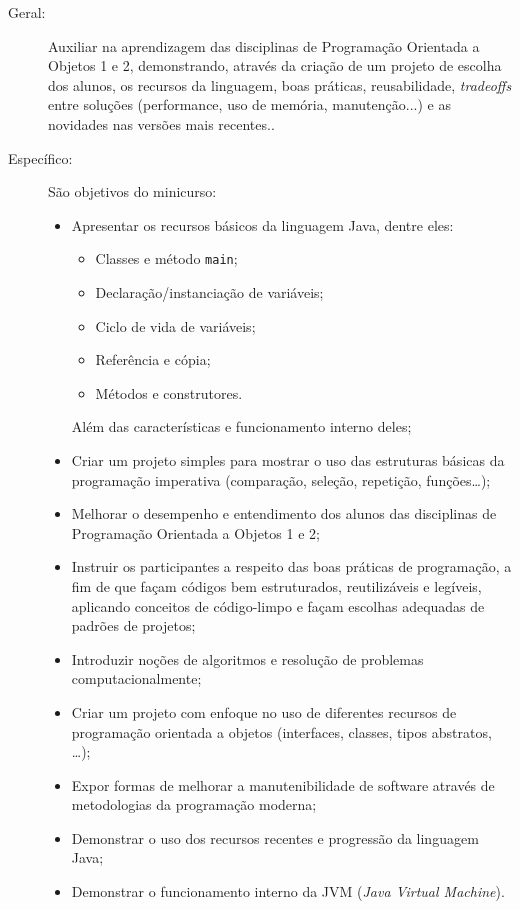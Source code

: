 \documentclass{article}
\begin{document}
\begin{description}
    \item[Geral:] Auxiliar na aprendizagem das disciplinas de Programação Orientada a Objetos 1 e 2, demonstrando, através da criação de um projeto de escolha dos alunos, os recursos da linguagem, boas práticas, reusabilidade, \textit{tradeoffs} entre soluções (performance, uso de memória, manutenção...) e as novidades nas versões mais recentes..
    \item[Específico:] São objetivos do minicurso:
        \begin{itemize}[label={-}]
                \item Apresentar os recursos básicos da linguagem Java, dentre eles:
\begin{itemize}[label={-}]    \item Classes e método \texttt{main};
    \item Declaração/instanciação de variáveis;
    \item Ciclo de vida de variáveis;
    \item Referência e cópia;
    \item Métodos e construtores.
\end{itemize}Além das características e funcionamento interno deles;
                \item Criar um projeto simples para mostrar o uso das  estruturas básicas da programação imperativa  (comparação, seleção, repetição, funções\ldots);
                \item Melhorar o desempenho e entendimento dos alunos das  disciplinas de Programação Orientada a Objetos 1 e 2;
                \item Instruir os participantes a respeito das boas práticas de programação, a fim de que façam códigos bem  estruturados, reutilizáveis e legíveis, aplicando  conceitos de código-limpo e façam escolhas adequadas de  padrões de projetos;
                \item Introduzir noções de algoritmos e resolução de problemas computacionalmente;
                \item Criar um projeto com enfoque no uso de diferentes recursos de programação orientada a objetos (interfaces, classes, tipos abstratos, \ldots);
                \item Expor formas de melhorar a manutenibilidade de software através de metodologias da programação moderna;
                \item Demonstrar o uso dos recursos recentes e progressão da linguagem Java;
                \item Demonstrar o funcionamento interno da JVM (\textit{Java Virtual Machine}).
        \end{itemize}
\end{description}
\end{document}

